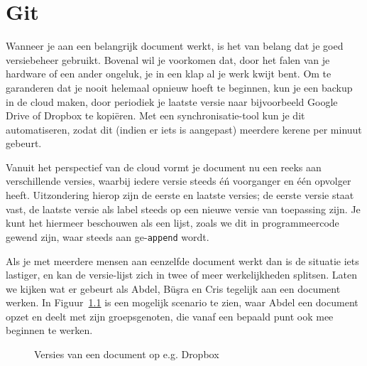 \chapter{Git}

Wanneer je aan een belangrijk document werkt, is het van belang dat je goed versiebeheer gebruikt. Bovenal wil je voorkomen dat, door het falen van je hardware of een ander ongeluk, je in een klap al je werk kwijt bent. Om te garanderen dat je nooit helemaal opnieuw hoeft te beginnen, kun je een backup in de cloud maken, door periodiek je laatste versie naar bijvoorbeeld Google Drive of Dropbox te kopi\"eren. Met een synchronisatie-tool kun je dit automatiseren, zodat dit (indien er iets is aangepast) meerdere kerene per minuut gebeurt.

Vanuit het perspectief van de cloud vormt je document nu een reeks aan verschillende versies, waarbij iedere versie steeds \'e\'n voorganger en  \'e\'en opvolger heeft. Uitzondering hierop zijn de eerste en laatste versies; de eerste versie staat vast, de laatste versie als label steeds op een nieuwe versie van toepassing zijn. Je kunt het hiermeer beschouwen als een lijst, zoals we dit in programmeercode gewend zijn, waar steeds aan ge-\texttt{append} wordt.

Als je met meerdere mensen aan eenzelfde document werkt dan is de situatie iets lastiger, en kan de versie-lijst zich in twee of meer werkelijkheden splitsen. Laten we kijken wat er gebeurt als Abdel, B\"u\c sra en Cris tegelijk aan een document werken. In Figuur~\ref{fig:doctree} is een mogelijk scenario te zien, waar Abdel een document opzet en deelt met zijn groepsgenoten, die vanaf een bepaald punt ook mee beginnen te werken.

\begin{figure}[ht]
\label{fig:doctree}
\caption{Versies van een document op e.g. Dropbox}
\end{figure}

